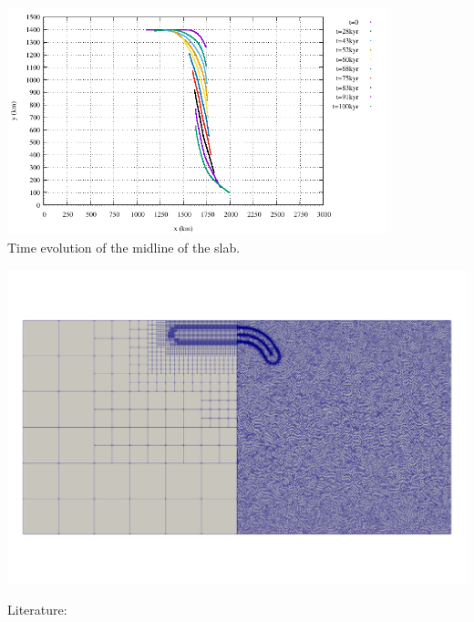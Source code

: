 \begin{center}
\includegraphics[width=11cm]{python_codes/fieldstone_55/images/mid_evolution}\\
{\captionfont Time evolution of the midline of the slab.}
\end{center}


\begin{center}
\includegraphics[width=14cm]{python_codes/fieldstone_55/images/meshes}
\end{center}


\vspace{3cm}



Literature: \cite{fogm14}
